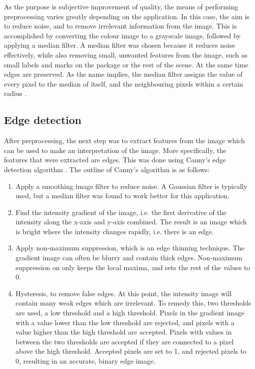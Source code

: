 As the purpose is subjective improvement of quality, the means of performing preprocessing varies greatly depending on the application.
In this case, the aim is to reduce noise, and to remove irrelevant information from the image.
This is accomplished by converting the colour image to a grayscale image, followed by applying a median filter. 
A median filter was chosen because it reduces noise effectively, while also removing small, unwanted features from the image, such as small labels and marks on the package or the rest of the scene.
At the same time edges are preserved.
As the name implies, the median filter assigns the value of every pixel to the median of itself, and the neighbouring pixels within a certain radius \cite{huang1979fast}.

\subsection{Edge detection}
After preprocessing, the next step was to extract features from the image which can be used to make an interpretation of the image.
More specifically, the features that were extracted are edges. 
This was done using Canny's edge detection algorithm \cite{canny}. %
The outline of Canny's algorithm is as follows:
\begin{enumerate}
	\item Apply a smoothing image filter to reduce noise. A Gaussian filter is typically used, but a median filter was found to work better for this application.
	\item Find the intensity gradient of the image, i.e. the first derivative of the intensity along the x-axis and y-axis combined. The result is an image which is bright where the intensity changes rapidly, i.e. there is an edge.
	\item Apply non-maximum suppression, which is an edge thinning technique. The gradient image can often be blurry and contain thick edges. Non-maximum suppression on only keeps the local maxima, and sets the rest of the values to 0.
	\item Hysteresis, to remove false edges. At this point, the intensity image will contain many weak edges which are irrelevant. To remedy this, two thresholds are used, a low threshold and a high threshold. Pixels in the gradient image with a value lower than the low threshold are rejected, and pixels with a value  higher than the high threshold are accepted. Pixels with values in between the two thresholds are accepted if they are connected to a pixel above the high threshold. Accepted pixels are set to 1, and rejected pixels to 0, resulting in an accurate, binary edge image.
\end{enumerate}

